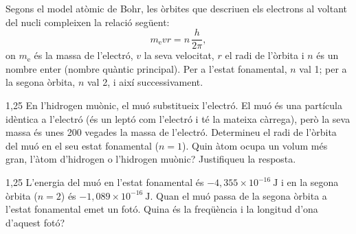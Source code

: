 Segons el model atòmic de Bohr, les òrbites que descriuen els electrons al voltant del nucli compleixen la relació següent:
\[ m_\mathrm{e} v r = n\,\frac{h}{2\pi}, \]
on $m_\mathrm{e}$ és la massa de l'electró, $v$ la seva velocitat, $r$ el radi de l'òrbita i $n$ és un nombre enter (nombre quàntic principal). Per a l'estat fonamental, $n$ val 1; per a la segona òrbita, $n$ val 2, i així successivament.


\begin{apartat}{1,25}
En l'hidrogen muònic, el muó substitueix l'electró. El muó és una partícula idèntica a l'electró (és un leptó com l'electró i té la mateixa càrrega), però la seva massa és unes 200 vegades la massa de l'electró. Determineu el radi de l'òrbita del muó en el seu estat fonamental ($n = 1$). Quin àtom ocupa un volum més gran, l'àtom d'hidrogen o l'hidrogen muònic? Justifiqueu la resposta.
\end{apartat}

\begin{apartat}{1,25}
L'energia del muó en l'estat fonamental és $-4,355\times 10^{-16}\ \mathrm{J}$ i en la segona òrbita ($n = 2$) és $-1,089\times 10^{-16}\ \mathrm{J}$. Quan el muó passa de la segona òrbita a l'estat fonamental emet un fotó. Quina és la freqüència i la longitud d'ona d'aquest fotó?
\end{apartat}

